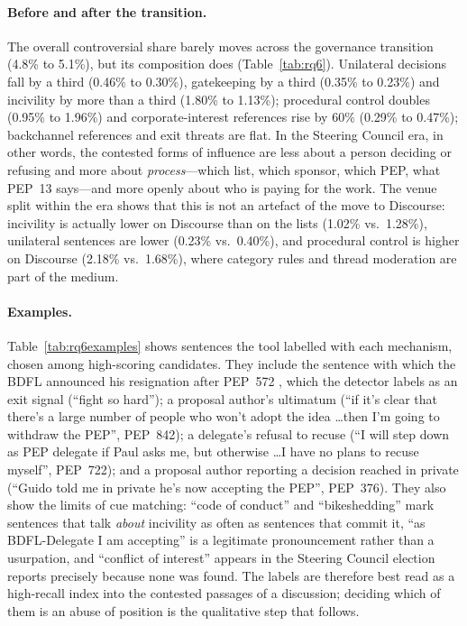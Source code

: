 \documentclass[sigconf,screen]{acmart}
\begin{document}
\paragraph{Before and after the transition.} The overall controversial share barely moves across the governance transition (4.8\% to 5.1\%), but its composition does (Table~\ref{tab:rq6}). Unilateral decisions fall by a third (0.46\% to 0.30\%), gatekeeping by a third (0.35\% to 0.23\%) and incivility by more than a third (1.80\% to 1.13\%); procedural control doubles (0.95\% to 1.96\%) and corporate-interest references rise by 60\% (0.29\% to 0.47\%); backchannel references and exit threats are flat. In the Steering Council era, in other words, the contested forms of influence are less about a person deciding or refusing and more about \emph{process}---which list, which sponsor, which PEP, what PEP~13 says---and more openly about who is paying for the work. The venue split within the era shows that this is not an artefact of the move to Discourse: incivility is actually lower on Discourse than on the lists (1.02\% vs.\ 1.28\%), unilateral sentences are lower (0.23\% vs.\ 0.40\%), and procedural control is higher on Discourse (2.18\% vs.\ 1.68\%), where category rules and thread moderation are part of the medium.

\paragraph{Examples.} Table~\ref{tab:rq6examples} shows sentences the tool labelled with each mechanism, chosen among high-scoring candidates. They include the sentence with which the BDFL announced his resignation after PEP~572 \cite{transferofpower}, which the detector labels as an exit signal (``fight so hard''); a proposal author's ultimatum (``if it's clear that there's a large number of people who won't adopt the idea \ldots then I'm going to withdraw the PEP'', PEP~842); a delegate's refusal to recuse (``I will step down as PEP delegate if Paul asks me, but otherwise \ldots I have no plans to recuse myself'', PEP~722); and a proposal author reporting a decision reached in private (``Guido told me in private he's now accepting the PEP'', PEP~376). They also show the limits of cue matching: ``code of conduct'' and ``bikeshedding'' mark sentences that talk \emph{about} incivility as often as sentences that commit it, ``as BDFL-Delegate I am accepting'' is a legitimate pronouncement rather than a usurpation, and ``conflict of interest'' appears in the Steering Council election reports precisely because none was found. The labels are therefore best read as a high-recall index into the contested passages of a discussion; deciding which of them is an abuse of position is the qualitative step that follows.
\end{document}

